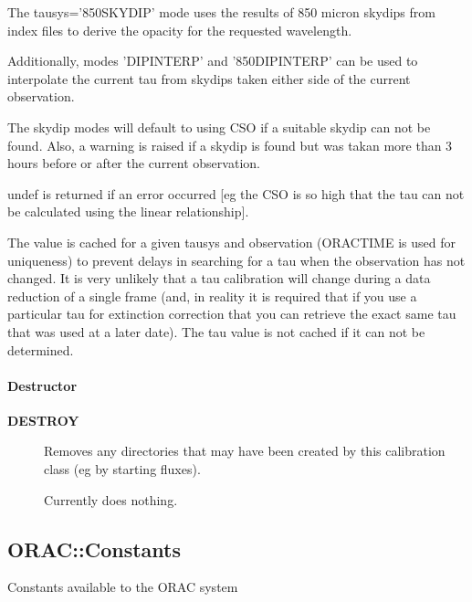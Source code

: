 \begin{description}
The tausys='850SKYDIP' mode uses the results of 850 micron skydips
from index files to derive the opacity for the requested wavelength.



Additionally, modes 'DIPINTERP' and '850DIPINTERP' can be used to
interpolate the current tau from skydips taken either side of the
current observation.



The skydip modes will default to using CSO if a suitable
skydip can not be found. Also, a warning is raised if a skydip
is found but was takan more than 3 hours before or after the
current observation.



undef is returned if an error occurred [eg the CSO is so high that the
tau can not be calculated using the linear relationship].



The value is cached for a given tausys and observation (ORACTIME is
used for uniqueness) to prevent delays in searching for a tau when the
observation has not changed. It is very unlikely that a tau calibration
will change during a data reduction of a single frame (and, in reality
it is required that if you use a particular tau for extinction correction
that you can retrieve the exact same tau that was used at a later date).
The tau value is not cached if it can not be determined.

\end{description}
\paragraph*{Destructor\label{ORAC::Calib::SCUBA_Destructor}}\begin{description}
\item[\textbf{DESTROY}] \mbox{}

Removes any directories that may have been created by this
calibration class (eg by starting fluxes).



Currently does nothing.

\end{description}


\subsection{ORAC::Constants\label{ORAC::Constants}}

Constants available to the ORAC system


